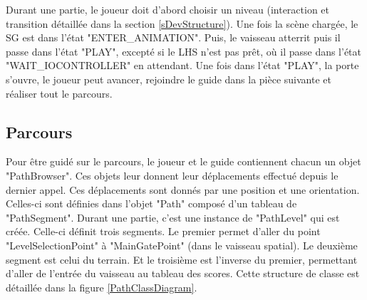 		Durant une partie, le joueur doit d'abord choisir un niveau (interaction et transition détaillée dans la section \ref{sDevStructure}). Une fois la scène chargée, le SG est dans l'état "ENTER\_ANIMATION". Puis, le vaisseau atterrit puis il passe dans l'état "PLAY", excepté si le LHS n'est pas prêt, où il passe dans l'état "WAIT\_IOCONTROLLER" en attendant. Une fois dans l'état "PLAY", la porte s'ouvre, le joueur peut avancer, rejoindre le guide dans la pièce suivante et réaliser tout le parcours.		
		
	\subsection*{Parcours}
		Pour être guidé sur le parcours, le joueur et le guide contiennent chacun un objet "PathBrowser". Ces objets leur donnent leur déplacements effectué depuis le dernier appel. Ces déplacements sont donnés par une position et une orientation. Celles-ci sont définies dans l'objet "Path" composé d'un tableau de "PathSegment". Durant une partie, c'est une instance de "PathLevel" qui est créée. Celle-ci définit trois segments. Le premier permet d'aller du point "LevelSelectionPoint" à "MainGatePoint" (dans le vaisseau spatial). Le deuxième segment est celui du terrain. Et le troisième est l'inverse du premier, permettant d'aller de l'entrée du vaisseau au tableau des scores. Cette structure de classe est détaillée dans la figure \ref{PathClassDiagram}.\medskip
		
		\begin{minipage}{\linewidth}
			\label{PathClassDiagram}
		\end{minipage}\medskip%
		
